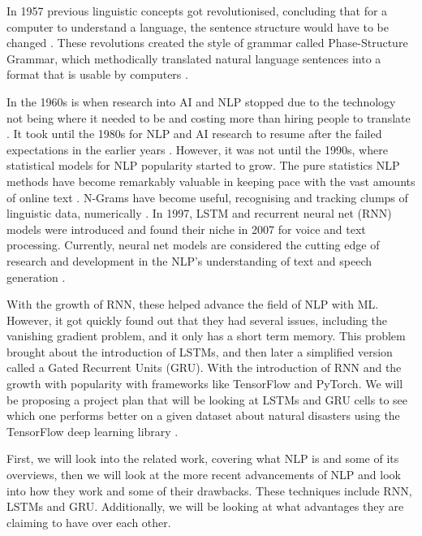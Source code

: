 \documentclass[a4paper,10pt]{article}
\begin{document}
	In 1957 previous linguistic concepts got revolutionised, concluding that for a computer to understand a language, the sentence structure would have to be changed \cite{chomsky2002syntactic}. These revolutions created the style of grammar called Phase-Structure Grammar, which methodically translated natural language sentences into a format that is usable by computers \cite{nlp_history}. 
	
	In the 1960s is when research into AI and NLP stopped due to the technology not being where it needed to be and costing more than hiring people to translate \cite{nlp_history}. It took until the 1980s for NLP and AI \cite{what_ai} research to resume after the failed expectations in the earlier years \cite{nlp_history}. However, it was not until the 1990s, where statistical models for NLP popularity started to grow. The pure statistics NLP methods have become remarkably valuable in keeping pace with the vast amounts of online text \cite{nlp_history}. N-Grams have become useful, recognising and tracking clumps of linguistic data, numerically \cite{n_grams}. In 1997, LSTM and recurrent neural net (RNN) models \cite{nlp_rnn} were introduced and found their niche in 2007 for voice and text processing. Currently, neural net models are considered the cutting edge of research and development in the NLP's understanding of text and speech generation \cite{nlp_history}.
	
	With the growth of RNN, these helped advance the field of NLP with ML. However, it got quickly found out that they had several issues, including the vanishing gradient problem, and it only has a short term memory. This problem brought about the introduction of LSTMs, and then later a simplified version called a Gated Recurrent Units (GRU). With the introduction of RNN and the growth with popularity with frameworks like TensorFlow and PyTorch. We will be proposing a project plan that will be looking at LSTMs and GRU cells to see which one performs better on a given dataset about natural disasters \cite{disater_kaggle} using the TensorFlow deep learning library \cite{tensorflow}.
	
	First, we will look into the related work, covering what NLP is and some of its overviews, then we will look at the more recent advancements of NLP and look into how they work and some of their drawbacks. These techniques include RNN, LSTMs and GRU. Additionally, we will be looking at what advantages they are claiming to have over each other.
	
\end{document}
